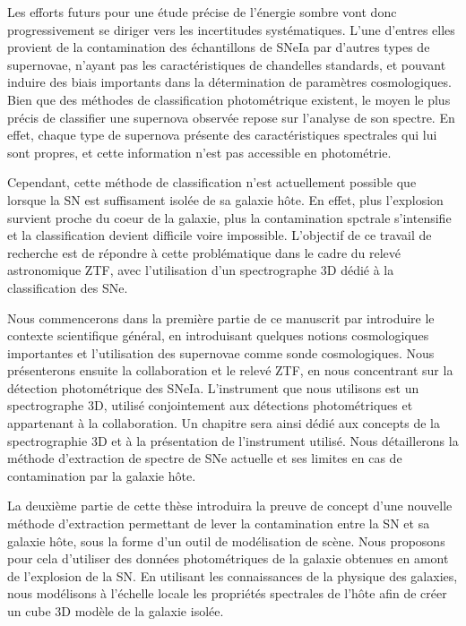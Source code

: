 \documentclass[../main/main.tex]{subfiles}
\begin{document}
Les efforts futurs pour une étude précise de l'énergie sombre vont donc progressivement
se diriger vers les incertitudes systématiques. L'une d'entres elles
provient de la contamination des échantillons de SNeIa par d'autres
types de supernovae, n'ayant pas les caractéristiques de chandelles
standards, et pouvant induire des biais importants dans la détermination
de paramètres cosmologiques. Bien que des méthodes de classification photométrique
existent, le moyen le plus précis de classifier une supernova
observée repose sur l'analyse de son spectre. En effet, chaque type de
supernova présente des caractéristiques spectrales qui lui sont propres,
et cette information n'est pas accessible en photométrie.

Cependant, cette méthode de classification n'est actuellement possible que
lorsque la SN est suffisament isolée de sa galaxie hôte. En effet, plus
l'explosion survient proche du coeur de la galaxie, plus la
contamination spctrale s'intensifie et la classification devient
difficile voire impossible. L'objectif de ce travail de recherche est de
répondre à cette problématique dans le cadre du relevé astronomique ZTF,
avec l'utilisation d'un spectrographe 3D dédié à la classification des
SNe.

Nous commencerons dans la première partie de ce manuscrit par introduire
le contexte scientifique général, en introduisant quelques notions
cosmologiques importantes et l'utilisation des supernovae comme sonde
cosmologiques. Nous présenterons ensuite la collaboration et le relevé
ZTF, en nous concentrant sur la détection photométrique des
SNeIa. L'instrument que nous utilisons est un spectrographe 3D, utilisé
conjointement aux détections photométriques et appartenant à la
collaboration. Un chapitre sera ainsi dédié aux
concepts de la spectrographie 3D et à la présentation de l'instrument
utilisé. Nous détaillerons la méthode d'extraction de spectre de SNe
actuelle et ses limites en cas de contamination par la galaxie hôte.

La deuxième partie de cette thèse introduira la preuve de concept d'une
nouvelle méthode d'extraction permettant de lever la contamination
entre la SN et sa galaxie hôte, sous la forme d'un outil de modélisation
de scène. Nous proposons pour cela d'utiliser des
données photométriques de la galaxie obtenues en amont de l'explosion de
la SN. En utilisant les connaissances de la physique
des galaxies, nous modélisons à l’échelle locale les propriétés
spectrales de l'hôte afin de créer un cube 3D modèle de la galaxie
isolée.
\end{document}
